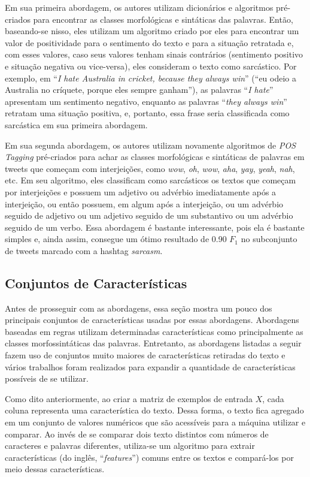 Em sua primeira abordagem, os autores utilizam dicionários e algoritmos
pré-criados para encontrar as classes morfológicas e sintáticas das palavras.
Então, baseando-se nisso, eles utilizam um algoritmo criado por eles para
encontrar um valor de positividade para o sentimento do texto e para a situação
retratada e, com esses valores, caso seus valores tenham sinais contrários
(sentimento positivo e situação negativa ou vice-versa), eles consideram o texto
como sarcástico. Por exemplo, em ``\textit{I hate Australia in cricket, because
they always win}'' (``eu odeio a Australia no críquete, porque eles sempre
ganham''), as palavras ``\textit{I hate}'' apresentam um sentimento negativo,
enquanto as palavras ``\textit{they always win}'' retratam uma situação
positiva, e, portanto, essa frase seria classificada como sarcástica em sua
primeira abordagem.

Em sua segunda abordagem, os autores utilizam novamente algoritmos de
\textit{POS Tagging} pré-criados para achar as classes morfológicas e sintáticas
de palavras em tweets que começam com interjeições, como \textit{wow},
\textit{oh}, \textit{wow}, \textit{aha}, \textit{yay}, \textit{yeah},
\textit{nah}, etc. Em seu algoritmo, eles classificam como sarcásticos os textos
que começam por interjeições e possuem um adjetivo ou advérbio imediatamente
após a interjeição, ou então possuem, em algum após a interjeição, ou um
advérbio seguido de adjetivo ou um adjetivo seguido de um substantivo ou um
advérbio seguido de um verbo. Essa abordagem é bastante interessante, pois ela é
bastante simples e, ainda assim, consegue um ótimo resultado de 0.90 $F_1$ no
subconjunto de tweets marcado com a hashtag \textit{sarcasm}.

\subsection{Conjuntos de Características}%
\label{sub:conjuntos-de-caracteristicas}

Antes de prosseguir com as abordagens, essa seção mostra um pouco dos
principais conjuntos de características usadas por essas abordagens. Abordagens
baseadas em regras utilizam determinadas características como principalmente as
classes morfossintáticas das palavras. Entretanto, as abordagens listadas a
seguir fazem uso de conjuntos muito maiores de características retiradas do
texto e vários trabalhos foram realizados para expandir a quantidade de
características possíveis de se utilizar.

Como dito anteriormente, ao criar a matriz de exemplos de entrada $X$, cada
coluna representa uma característica do texto. Dessa forma, o texto fica
agregado em um conjunto de valores numéricos que são acessíveis para a máquina
utilizar e comparar. Ao invés de se comparar dois texto distintos com números de
caracteres e palavras diferentes, utiliza-se um algoritmo para extrair
características (do inglês, ``\textit{features}'') comuns entre os textos e
compará-los por meio dessas características.

